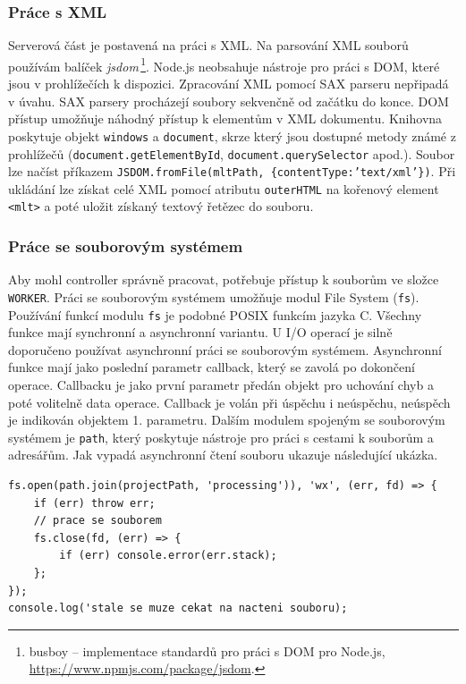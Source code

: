 \subsubsection{Práce s XML}
Serverová část je postavená na práci s XML. Na parsování XML souborů používám balíček \textit{jsdom}\,\footnote{busboy -- implementace standardů pro práci s DOM pro Node.js, \url{https://www.npmjs.com/package/jsdom}.}. Node.js neobsahuje nástroje pro práci s DOM, které jsou v prohlížečích k dispozici. Zpracování XML pomocí SAX parseru nepřipadá v úvahu. SAX parsery procházejí soubory sekvenčně od začátku do konce. DOM přístup umožňuje náhodný přístup k elementům v XML dokumentu. Knihovna poskytuje objekt \texttt{windows} a \texttt{document}, skrze který jsou dostupné metody známé z prohlížečů (\texttt{document.getElementById}, \texttt{document.querySelector} apod.). Soubor lze načíst příkazem \texttt{JSDOM.fromFile(mltPath, \{contentType:'text/xml'\})}. Při ukládání lze získat celé XML pomocí atributu \texttt{outerHTML} na kořenový element \texttt{<mlt>} a poté uložit získaný textový řetězec do souboru.

\subsubsection{Práce se souborovým systémem}
Aby mohl controller správně pracovat, potřebuje přístup k souborům ve složce \texttt{WORKER}. Práci se souborovým systémem umožňuje modul File System (\texttt{fs}). Používání funkcí modulu \texttt{fs} je podobné POSIX funkcím jazyka C. Všechny funkce mají synchronní a asynchronní variantu. U I/O operací je silně doporučeno používat asynchronní práci se souborovým systémem. Asynchronní funkce mají jako poslední parametr callback, který se zavolá po dokončení operace. Callbacku je jako první parametr předán objekt pro uchování chyb a poté volitelně data operace. Callback je volán při úspěchu i neúspěchu, neúspěch je indikován objektem 1. parametru. Dalším modulem spojeným se souborovým systémem je \texttt{path}, který poskytuje nástroje pro práci s cestami k souborům a adresářům. Jak vypadá asynchronní čtení souboru ukazuje následující ukázka.
\begin{lstlisting}[style=JavaScript]
fs.open(path.join(projectPath, 'processing')), 'wx', (err, fd) => {
    if (err) throw err;
    // prace se souborem
    fs.close(fd, (err) => {
        if (err) console.error(err.stack);
    };
});
console.log('stale se muze cekat na nacteni souboru);
\end{lstlisting}

